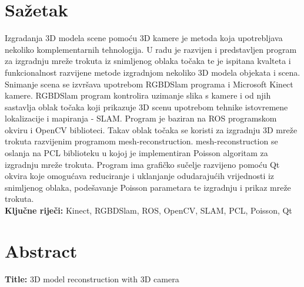 \newpage
\thispagestyle{empty}

\section*{Sažetak} %
\label{sec:Sažetak}


Izgradanja 3D modela scene pomoću 3D kamere je metoda koja upotrebljava
nekoliko komplementarnih tehnologija. U radu je razvijen i predstavljen
program za izgradnju mreže trokuta iz snimljenog oblaka točaka te je
ispitana kvalteta i funkcionalnost razvijene metode izgradnjom nekoliko
3D modela objekata i scena.  Snimanje scena se izvršava upotrebom
RGBDSlam programa i Microsoft Kinect kamere. RGBDSlam program kontrolira
uzimanje slika s kamere i od njih sastavlja oblak točaka koji prikazuje
3D scenu upotrebom tehnike istovremene lokalizacije i mapiranja - SLAM.
Program je baziran na ROS programskom okviru i OpenCV biblioteci. Takav
oblak točaka se koristi za izgradnju 3D mreže trokuta razvijenim
programom mesh-reconstruction. mesh-reconstruction se oslanja na PCL
biblioteku u kojoj je implementiran Poisson algoritam za izgradnju mreže
trokuta. Program ima grafičko sučelje razvijeno pomoću Qt okvira koje
omogućava reduciranje i uklanjanje odudarajućih vrijednosti iz
snimljenog oblaka, podešavanje Poisson parametara te izgradnju i prikaz
mreže trokuta.  \\

\noindent\textbf{Ključne riječi:} Kinect, RGBDSlam, ROS, OpenCV, SLAM, PCL,
Poisson, Qt

\section*{Abstract} %
\label{sec:Abstract}
\textbf{Title:} 3D model reconstruction with 3D camera \\

